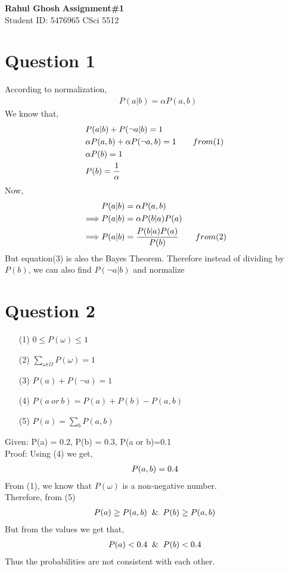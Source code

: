 \documentclass[letter, 11pt]{article}
\begin{document}
\noindent
\large \textbf{Rahul Ghosh} \hfill \textbf{Assignment\#1}\\
\normalsize Student ID: 5476965 \hfill CSci 5512\\

\section*{Question 1}
\setcounter{equation}{0}
According to normalization,
\begin{align}
    & P(a|b) = \alpha P(a,b)
\end{align}
We know that,
\begin{align}
    & P(a|b) + P(\neg a|b) = 1\notag\\
    & \alpha P(a,b) + \alpha P(\neg a,b) = 1 \qquad from (1)\notag\\
    & \alpha P(b) = 1\notag\\
    & P(b) = \frac{1}{\alpha}
\end{align}
Now,
\begin{align}
    & P(a|b)=\alpha P(a,b)\notag\\
    \implies & P(a|b)=\alpha P(b|a)P(a)\notag\\
    \implies & P(a|b) = \frac{P(b|a)P(a)}{P(b)} \qquad from (2)
\end{align}
But equation(3) is also the Bayes Theorem. Therefore instead of dividing by $P(b)$, we can also find $P(\neg a|b)$ and normalize

\section*{Question 2}
\setcounter{equation}{0}
\begin{itemize}
    \item[(1)] $0 \leq P(\omega) \leq 1$
    \item[(2)] $\sum_{\omega \epsilon \Omega} P(\omega)=1$
    \item[(3)] $P(a) + P(\neg a) = 1$
    \item[(4)] $P(a\ or\ b) = P(a) + P(b) - P(a,b)$
    \item[(5)] $P(a) = \sum_{b} P(a,b)$
\end{itemize}
Given: P(a) = 0.2, P(b) = 0.3, P(a or b)=0.1\\
Proof: Using (4) we get, 
\begin{align}
    P(a,b) = 0.4\notag
\end{align}
From (1), we know that $P(\omega)$ is a non-negative number.\\
Therefore, from (5)
\begin{align}
    P(a) \geq P(a,b) \And P(b) \geq P(a,b) \notag
\end{align}
But from the values we get that,
\begin{align}
    P(a) < 0.4 \And P(b) < 0.4\notag
\end{align}
Thus the probabilities are not consistent with each other.
\end{document}
